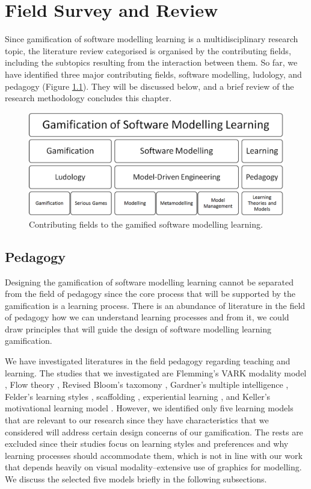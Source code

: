 \documentclass[12pt, a4paper]{report}
\begin{document}
\chapter{Field Survey and Review}
\label{Field Survey and Review}
Since gamification of software modelling learning is a multidisciplinary research topic, the literature review categorised is organised by the contributing fields, including the subtopics resulting from the interaction between them. So far, we have identified three major contributing fields, software modelling, ludology, and pedagogy (Figure \ref{smlg2}). They will be discussed below, and a brief review of the research methodology concludes this chapter.

\begin{figure}[ht]
\centering
\includegraphics[width=12cm]{smlg2}
\caption{Contributing fields to the gamified software modelling learning.}
\label{smlg2}
\end{figure}

\section{Pedagogy}
\label{Pedagogy}
Designing the gamification of software modelling learning cannot be separated from the field of pedagogy since the core process that will be supported by the gamification is a learning process. There is an abundance of literature in the field of pedagogy how we can understand learning processes and from it, we could draw principles that will guide the design of software modelling learning gamification. 

We have investigated literatures in the field pedagogy regarding teaching and learning. The studies that we investigated are Flemming's VARK modality model \cite{fleming2006learning}, Flow theory \cite{csikszentmihalyi2014toward}, Revised Bloom's taxomony \cite{krathwohl2002revision}, Gardner's multiple intelligence \cite{gardner2011frames}, Felder's learning styles \cite{felder1988learning},  scaffolding \cite{wood1976role, vygotsky1978mind}, experiential learning \cite{kolb2014experiential}, and Keller's motivational learning model \cite{keller2010motivational}. However, we identified only five learning models that are relevant to our research since they have characteristics that we considered will address certain design concerns of our gamification. The rests are excluded since their studies focus on learning styles and preferences and why learning processes should accommodate them, which is not in line with our work that  depends heavily on visual modality--extensive use of graphics for modelling. We discuss the selected five models briefly in the following subsections.
\end{document}

